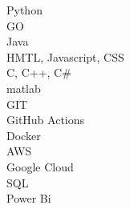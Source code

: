 
 Python\\
 GO\\
 Java\\
 HMTL, Javascript, CSS\\
 C, C++, C\#\\
 matlab\\
 GIT\\
 GitHub Actions\\
 Docker\\
 AWS\\
 Google Cloud\\
 SQL\\
 Power Bi\\
